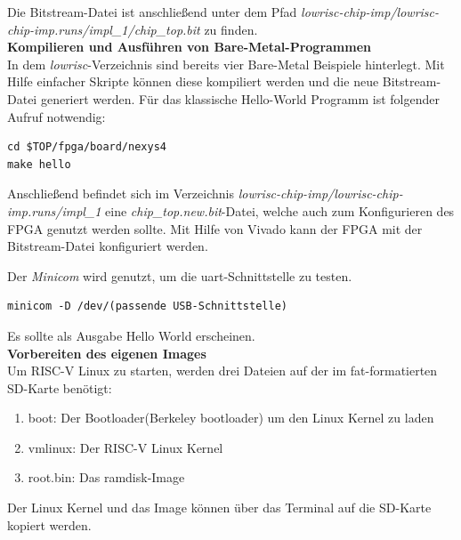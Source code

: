 Die Bitstream-Datei ist anschließend unter dem Pfad \emph{lowrisc-chip-imp/lowrisc-chip-imp.runs/impl\_1/chip\_top.bit} zu finden.\\

\textbf{Kompilieren und Ausführen von Bare-Metal-Programmen}\\

In dem \emph{lowrisc}-Verzeichnis sind bereits vier Bare-Metal Beispiele hinterlegt. Mit Hilfe einfacher Skripte können diese kompiliert werden und die neue Bitstream-Datei generiert werden.
Für das klassische Hello-World Programm ist folgender Aufruf notwendig:\\

\begin{lstlisting}[caption={Erzeugen und kompilieren eines Beispielprogrammes},label={code:helloworld}]
cd $TOP/fpga/board/nexys4
make hello
\end{lstlisting}


Anschließend befindet sich im Verzeichnis \emph{lowrisc-chip-imp/lowrisc-chip-imp.runs/impl\_1} eine \emph{chip\_top.new.bit}-Datei, welche auch zum Konfigurieren des FPGA genutzt werden sollte.
Mit Hilfe von Vivado kann der FPGA mit der Bitstream-Datei konfiguriert werden.

Der \emph{Minicom} wird genutzt, um die \ac{uart}-Schnittstelle zu testen.\\

\begin{lstlisting}[caption={Aufruf des \emph{Minicom}},label={code:minicom}]
minicom -D /dev/(passende USB-Schnittstelle)
\end{lstlisting}


Es sollte als Ausgabe Hello World erscheinen.\\

\textbf{Vorbereiten des eigenen Images}\\

Um RISC-V Linux zu starten, werden drei Dateien auf der im \ac{fat}-formatierten SD-Karte benötigt:
\begin{enumerate}
  \item boot: Der Bootloader(Berkeley bootloader) um den Linux Kernel zu laden
  \item vmlinux: Der RISC-V Linux Kernel
  \item root.bin: Das ramdisk-Image
\end{enumerate}

\vspace{5mm}
Der Linux Kernel und das Image können über das Terminal auf die SD-Karte kopiert werden.

